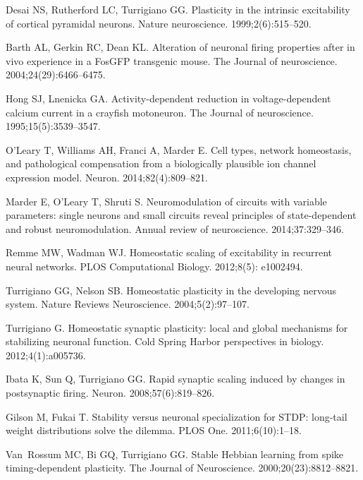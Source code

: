 \documentclass[10pt,letterpaper]{article}
\begin{document}
\begin{thebibliography}{10}
Desai NS, Rutherford LC, Turrigiano GG.
\newblock Plasticity in the intrinsic excitability of cortical pyramidal
  neurons.
\newblock Nature neuroscience. 1999;2(6):515--520.

Barth AL, Gerkin RC, Dean KL.
\newblock Alteration of neuronal firing properties after in vivo experience in
  a FosGFP transgenic mouse.
\newblock The Journal of neuroscience. 2004;24(29):6466--6475.

Hong SJ, Lnenicka GA.
\newblock Activity-dependent reduction in voltage-dependent calcium current in
  a crayfish motoneuron.
\newblock The Journal of neuroscience. 1995;15(5):3539--3547.

O’Leary T, Williams AH, Franci A, Marder E.
\newblock Cell types, network homeostasis, and pathological compensation from a
  biologically plausible ion channel expression model.
\newblock Neuron. 2014;82(4):809--821.

Marder E, O'Leary T, Shruti S.
\newblock Neuromodulation of circuits with variable parameters: single neurons
  and small circuits reveal principles of state-dependent and robust
  neuromodulation.
\newblock Annual review of neuroscience. 2014;37:329--346.

Remme MW, Wadman WJ.
\newblock Homeostatic scaling of excitability in recurrent neural networks.
\newblock PLOS Computational Biology. 2012;8(5): e1002494.

Turrigiano GG, Nelson SB.
\newblock Homeostatic plasticity in the developing nervous system.
\newblock Nature Reviews Neuroscience. 2004;5(2):97--107.

Turrigiano G.
\newblock Homeostatic synaptic plasticity: local and global mechanisms for
  stabilizing neuronal function.
\newblock Cold Spring Harbor perspectives in biology. 2012;4(1):a005736.

Ibata K, Sun Q, Turrigiano GG.
\newblock Rapid synaptic scaling induced by changes in postsynaptic firing.
\newblock Neuron. 2008;57(6):819--826.

Gilson M, Fukai T.
\newblock Stability versus neuronal specialization for STDP: long-tail weight
  distributions solve the dilemma.
\newblock PLOS One. 2011;6(10):1--18.

Van~Rossum MC, Bi GQ, Turrigiano GG.
\newblock Stable Hebbian learning from spike timing-dependent plasticity.
\newblock The Journal of Neuroscience. 2000;20(23):8812--8821.


\end{thebibliography}
\end{document}
